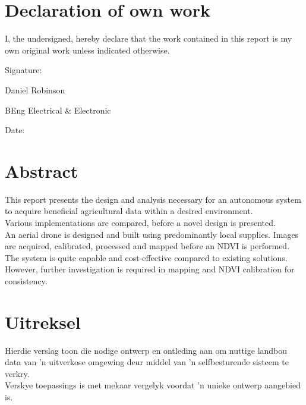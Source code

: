 \setcounter{secnumdepth}{-2}%

\newpage
\chapter{Declaration of own work}

I, the undersigned, hereby declare that the work contained in this report is my own original work
unless indicated otherwise.

\vspace{2.5cm}   

Signature: \hrulefill

\hspace*{0mm}\phantom{Signature: }Daniel Robinson

\hspace*{0mm}\phantom{Signature: }BEng Electrical \& Electronic

\vspace{1cm}   

Date:\space\space\space\space\space\hrulefill

\chapter{Abstract}

This report presents the design and analysis necessary for an autonomous system to acquire beneficial agricultural data within a desired environment.\\

Various implementations are compared, before a novel design is presented.\\

An aerial drone is designed and built using predominantly local supplies. Images are acquired, calibrated, processed and mapped before an NDVI is performed. The system is quite capable and cost-effective compared to existing solutions. However, further investigation is required in mapping and NDVI calibration for consistency.

\chapter{Uitreksel}

Hierdie verslag toon die nodige ontwerp en ontleding aan om nuttige landbou data van 'n uitverkose omgewing deur middel van 'n selfbesturende sisteem te verkry.\\

Verskye toepassings is met mekaar vergelyk voordat 'n unieke ontwerp aangebied is.\\

